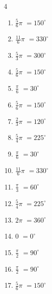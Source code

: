 \begin{multicols}{4}
\begin{enumerate}
  \item $\displaystyle \frac{5}{6}\pi$
        $\displaystyle =150^{\circ}$

  \item $\displaystyle \frac{11}{6}\pi$
        $\displaystyle =330^{\circ}$

  \item $\displaystyle \frac{5}{3}\pi$
        $\displaystyle =300^{\circ}$

  \item $\displaystyle \frac{5}{6}\pi$
        $\displaystyle =150^{\circ}$

  \item $\displaystyle \frac{\pi}{6}$
        $\displaystyle =30^{\circ}$

  \item $\displaystyle \frac{5}{6}\pi$
        $\displaystyle =150^{\circ}$

  \item $\displaystyle \frac{2}{3}\pi$
        $\displaystyle =120^{\circ}$

  \item $\displaystyle \frac{5}{4}\pi$
        $\displaystyle =225^{\circ}$

  \item $\displaystyle \frac{\pi}{6}$
        $\displaystyle =30^{\circ}$

  \item $\displaystyle \frac{11}{6}\pi$
        $\displaystyle =330^{\circ}$

  \item $\displaystyle \frac{\pi}{3}$
        $\displaystyle =60^{\circ}$

  \item $\displaystyle \frac{5}{4}\pi$
        $\displaystyle =225^{\circ}$

  \item $\displaystyle 2\pi$
        $\displaystyle =360^{\circ}$

  \item $\displaystyle 0$
        $\displaystyle =0^{\circ}$

  \item $\displaystyle \frac{\pi}{2}$
        $\displaystyle =90^{\circ}$

\columnbreak %

  \item $\displaystyle \frac{\pi}{2}$
        $\displaystyle =90^{\circ}$

  \item $\displaystyle \frac{5}{6}\pi$
        $\displaystyle =150^{\circ}$


\end{enumerate}
\end{multicols}
